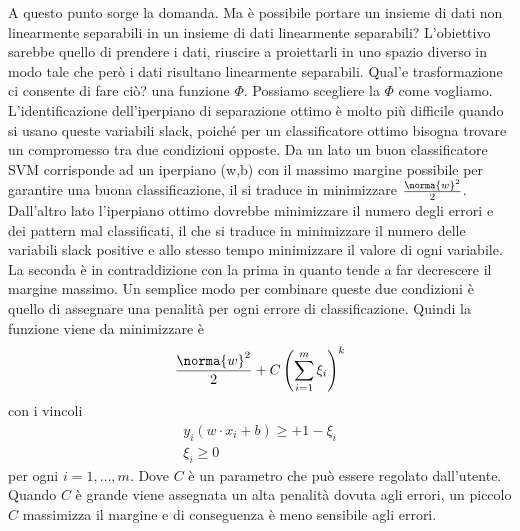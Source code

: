 \noindent A questo punto sorge la domanda. Ma è possibile portare un insieme di dati non linearmente separabili in un insieme di dati linearmente separabili? L'obiettivo sarebbe quello di prendere i dati, riuscire a proiettarli in uno spazio diverso in modo tale che però i dati risultano linearmente separabili. Qual'e trasformazione ci consente di fare ciò? una funzione $\Phi$. Possiamo scegliere la $\Phi$ come vogliamo.\\

\noindent L'identificazione dell'iperpiano di separazione ottimo è molto più difficile quando si usano queste variabili slack, poiché per un classificatore ottimo bisogna trovare un compromesso tra due condizioni opposte. Da un lato un buon classificatore SVM corrisponde ad un iperpiano (w,b) con il massimo margine possibile per garantire una buona classificazione, il si traduce in minimizzare $\frac{\norma{w}^2}{2}$. Dall'altro lato l'iperpiano ottimo dovrebbe minimizzare il numero degli errori e dei pattern mal classificati, il che si traduce in minimizzare il numero delle variabili slack positive e allo stesso tempo minimizzare il valore di ogni variabile. La seconda è in contraddizione con la prima in quanto tende a far decrescere il margine massimo. Un semplice modo per combinare queste due condizioni è quello di assegnare una penalità per ogni errore di classificazione. Quindi la funzione viene da minimizzare è
\begin{equation}
\frac{\norma{w}^2}{2} + C\left( \sum_{i=1}^m \xi_i \right)^k
\end{equation}
con i vincoli 
\begin{gather}
y_i (w \cdot x_i + b) \geq +1 - \xi_i \\
\xi_i \geq 0
\end{gather}
per ogni $i=1, \dots, m$. Dove $C$ è un parametro che può essere regolato dall'utente. Quando $C$ è grande viene assegnata un alta penalità dovuta agli errori, un piccolo $C$ massimizza il margine e di conseguenza è meno sensibile agli errori. \\

